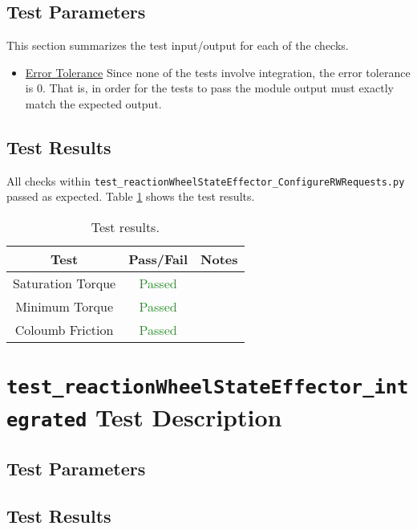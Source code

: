 \documentclass[]{BasiliskReportMemo}
\begin{document}
\subsection{Test Parameters}

This section summarizes the test input/output for each of the checks. 
\begin{itemize}
	\item \underline{Error Tolerance}
	Since none of the tests involve integration, the error tolerance is $0$. That is, in order for the tests to pass the module output must exactly match the expected output.
\end{itemize}


\subsection{Test Results}

All checks within {\tt test\_reactionWheelStateEffector\_ConfigureRWRequests.py} passed as expected. Table \ref{tab:results} shows the test results.

\begin{table}[htbp]
	\caption{Test results.}
	\label{tab:results}
	\centering \fontsize{10}{10}\selectfont
	\begin{tabular}{c | c | c  } %
		\hline
		\textbf{Test} & \textbf{Pass/Fail} & \textbf{Notes} \\ \hline
		Saturation Torque & \textcolor{ForestGreen}{Passed} & \\ \hline
		Minimum Torque & \textcolor{ForestGreen}{Passed} & \\ \hline
		Coloumb Friction & \textcolor{ForestGreen}{Passed} & \\ \hline
	\end{tabular}
\end{table}

\section{{\tt test\_reactionWheelStateEffector\_integrated} Test Description}

\subsection{Test Parameters}

\subsection{Test Results}
\end{document}
